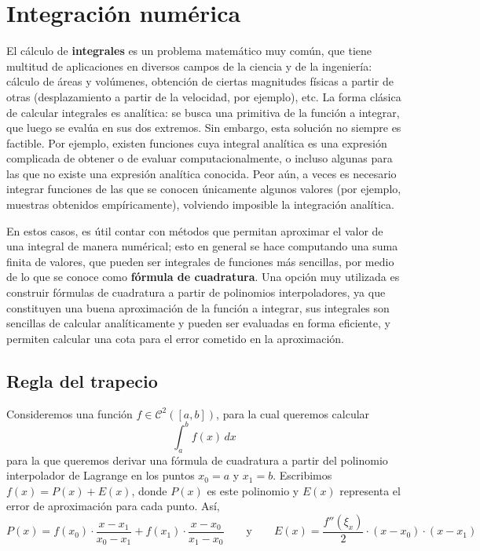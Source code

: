 
\section{Integración numérica}

El cálculo de \textbf{integrales} es un problema matemático muy común, que
tiene multitud de aplicaciones en diversos campos de la ciencia y de la
ingeniería: cálculo de áreas y volúmenes, obtención de ciertas magnitudes
físicas a partir de otras (desplazamiento a partir de la velocidad, por
ejemplo), etc. La forma clásica de calcular integrales es analítica: se busca
una primitiva de la función a integrar, que luego se evalúa en sus dos
extremos. Sin embargo, esta solución no siempre es factible. Por ejemplo,
existen funciones cuya integral analítica es una expresión complicada de
obtener o de evaluar computacionalmente, o incluso algunas para las que no
existe una expresión analítica conocida. Peor aún, a veces es necesario
integrar funciones de las que se conocen únicamente algunos valores (por
ejemplo, muestras obtenidos empíricamente), volviendo imposible la integración
analítica.

En estos casos, es útil contar con métodos que permitan aproximar el valor de
una integral de manera numérical; esto en general se hace computando una suma
finita de valores, que pueden ser integrales de funciones más sencillas, por
medio de lo que se conoce como \textbf{fórmula de cuadratura}. Una opción muy
utilizada es construir fórmulas de cuadratura a partir de polinomios
interpoladores, ya que constituyen una buena aproximación de la función a
integrar, sus integrales son sencillas de calcular analíticamente y pueden
ser evaluadas en forma eficiente, y permiten calcular una cota para el
error cometido en la aproximación.

\subsection{Regla del trapecio}

Consideremos una función $f \in \mathcal{C}^2([a,b])$, para la cual queremos
calcular
\[ \int_a^b f(x) \,dx \]
para la que queremos derivar una fórmula de cuadratura a partir del polinomio
interpolador de Lagrange en los puntos $x_0 = a$ y $x_1 = b$. Escribimos $f(x)
= P(x) + E(x)$, donde $P(x)$ es este polinomio y $E(x)$ representa el error de
aproximación para cada punto. Así,
\[ P(x) =  f(x_0) \cdot \frac{x - x_1}{x_0 - x_1}
    + f(x_1) \cdot \frac{x - x_0}{x_1 - x_0}
    \qquad \text{y} \qquad
    E(x) = \frac{f''(\xi_x)}{2} \cdot (x-x_0) \cdot (x-x_1) \]

